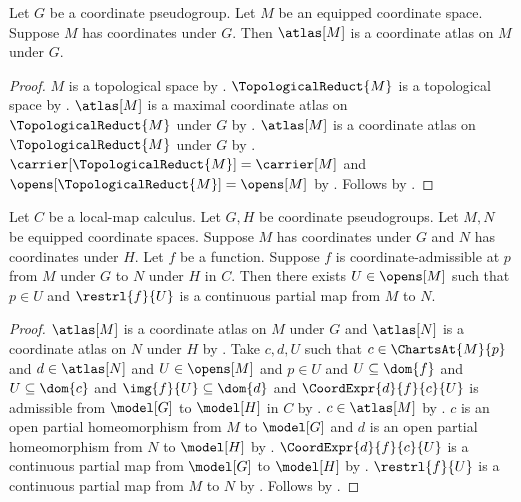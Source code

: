 \begin{theorem}\label{equipped_atlas_on_space}
    Let $G$ be a coordinate pseudogroup.
    Let $M$ be an equipped coordinate space.
    Suppose $M$ has coordinates under $G$.
    Then $\atlas[M]$ is a coordinate atlas on $M$ under $G$.
\end{theorem}
\begin{proof}
    $M$ is a topological space by .
    $\TopologicalReduct{M}$ is a topological space by
        .
    $\atlas[M]$ is a maximal coordinate atlas on $\TopologicalReduct{M}$ under $G$ by
        .
    $\atlas[M]$ is a coordinate atlas on $\TopologicalReduct{M}$ under $G$ by
        .
    $\carrier[\TopologicalReduct{M}]=\carrier[M]$ and
        $\opens[\TopologicalReduct{M}]=\opens[M]$ by
        .
    Follows by .
\end{proof}

\begin{theorem}\label{coordinate_admissible_local_continuity}
    Let $C$ be a local-map calculus.
    Let $G,H$ be coordinate pseudogroups.
    Let $M,N$ be equipped coordinate spaces.
    Suppose $M$ has coordinates under $G$ and $N$ has coordinates under $H$.
    Let $f$ be a function.
    Suppose $f$ is coordinate-admissible at $p$ from $M$ under $G$ to $N$ under $H$ in $C$.
    Then there exists $U\in\opens[M]$ such that $p\in U$ and
        $\restrl{f}{U}$ is a continuous partial map from $M$ to $N$.
\end{theorem}
\begin{proof}
    $\atlas[M]$ is a coordinate atlas on $M$ under $G$ and
        $\atlas[N]$ is a coordinate atlas on $N$ under $H$ by .
    Take $c,d,U$ such that $c\in\ChartsAt{M}{p}$ and $d\in\atlas[N]$ and
        $U\in\opens[M]$ and $p\in U$ and $U\subseteq\dom{f}$ and $U\subseteq\dom{c}$ and
        $\img{f}{U}\subseteq\dom{d}$ and
        $\CoordExpr{d}{f}{c}{U}$ is admissible from $\model[G]$ to $\model[H]$ in $C$
        by .
    $c\in\atlas[M]$ by .
    $c$ is an open partial homeomorphism from $M$ to $\model[G]$ and
        $d$ is an open partial homeomorphism from $N$ to $\model[H]$ by .
    $\CoordExpr{d}{f}{c}{U}$ is a continuous partial map from $\model[G]$ to $\model[H]$ by
        .
    $\restrl{f}{U}$ is a continuous partial map from $M$ to $N$ by
        .
    Follows by \auto.
\end{proof}

